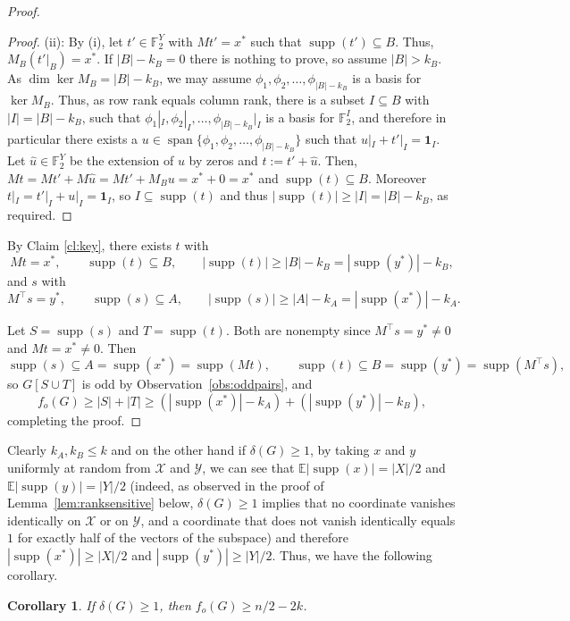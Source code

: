 \documentclass[11pt]{article}
\newcommand{\VV}[1]{{#1}}
\newtheorem{corollary}[theorem]{Corollary}
\theoremstyle{definition}
\theoremstyle{remark}
\newcommand{\supp}{\operatorname{supp}}
\newcommand{\fo}{f_o}
\newcommand{\1}{\mathbf{1}}
\DeclareMathOperator{\spn}{span}
\begin{document}
\begin{proof}
\begin{proof}
			(ii): By (i), let $t'\in \mathbb{F}_2^Y$ with $Mt'=x^*$ such that $\supp(t')\subseteq B$. Thus, $M_B(t'|_B)=x^*$. If $|B|-k_B=0$ there is nothing to prove, so assume $|B|>k_B$. As $\dim \ker M_B = |B| - k_B$, we may assume $\phi_1, \phi_2, \dots, \phi_{|B|-k_B}$ is a basis for $\ker  M_B$. Thus, as row rank equals column rank, there is a subset $I\subseteq B$ with $|I|=|B|-k_B$, such that $\phi_1|_I, \phi_2|_I, \dots, \phi_{|B|-k_B}|_I$ is a basis for $\mathbb{F}_2^{I}$, and therefore in particular there exists a $u\in\spn\{\phi_1, \phi_2, \dots, \phi_{|B|-k_B}\}$ such that $u|_I+t'|_I=\mathbf{1}_I$. Let $\hat u\in\mathbb{F}_2^{Y}$ be the extension of $u$ by zeros and $t:=t'+\hat u$. Then, $Mt=Mt'+M\hat u=Mt'+M_Bu=x^{*}+0=x^{*}$ and $\supp(t)\subseteq B$. Moreover $t|_I=t'|_I+u|_I=\mathbf{1}_I$, so $I\subseteq\supp(t)$ and thus $|\supp(t)|\ge|I|=|B|-k_B$, as required.
		\end{proof}
		
		By Claim \ref{cl:key}, there exists $t$ with
		\[
		Mt=x^{*},\qquad \supp(t)\subseteq B,\qquad |\supp(t)|\ge |B|-k_B=|\supp(y^*)|-k_B,
		\]
		and $s$ with
		\[
		M^{\top}s=y^{*},\qquad \supp(s)\subseteq A,\qquad
		|\supp(s)|\ge |A|-k_A=|\supp(x^*)|-k_A.
		\]
		
		Let $S=\supp(s)$ and $T=\supp(t)$. Both are nonempty since
		$M^{\top}s=y^{*}\ne 0$ and $Mt=x^{*}\ne 0$. Then
		\[
		\supp(s)\subseteq A=\supp(x^{*})=\supp(Mt),
		\qquad
		\supp(t)\subseteq B=\supp(y^{*})=\supp(M^{\top}s),
		\]
		so $G[S\cup T]$ is odd by Observation~\ref{obs:oddpairs}, and
		\[\fo(G)\geq |S|+|T|\ge(|\supp(x^*)|-k_A)+(|\supp(y^*)|-k_B),\]
		completing the proof.
	\end{proof}
	
	Clearly $k_A,k_B\leq k$ and on the other hand if $\delta(G)\geq 1$, by taking $x$ and $y$ uniformly at random from $\mathcal{X}$ and $\mathcal{Y}$, we can see that $\mathbb{E} |\supp(x)|=|X|/2$ and $\mathbb{E} |\supp(y)|=|Y|/2$ \VV{(indeed, as observed in the proof of Lemma~\ref{lem:ranksensitive} below, $\delta(G)\ge 1$ implies that no coordinate vanishes identically on $\mathcal{X}$ or on $\mathcal{Y}$, and a coordinate that does not vanish identically equals $1$ for exactly half of the vectors of the subspace)} and therefore $|\supp(x^*)|\geq |X|/2$ and $|\supp(y^*)|\geq |Y|/2$. Thus, we have the following corollary.
	
	\begin{corollary}\label{cor:n2minus2k}
		If $\delta(G)\geq 1$, then $\fo(G)\geq n/2-2k$.
	\end{corollary}
	
\end{document}
